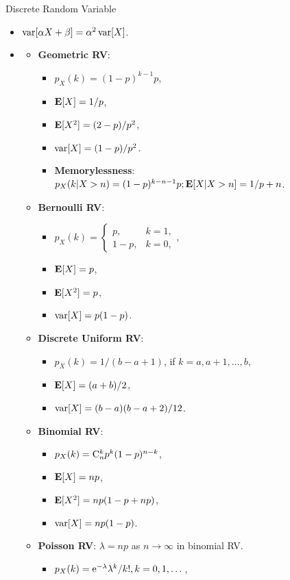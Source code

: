 \documentclass[landscape,a4paper]{article}
\begin{document}
\begin{cheatsheetcolumns}
\begin{card}{Discrete Random Variable}
\begin{itemize}
				\item $\operatorname{var}[\alpha X+\beta]=\alpha^2\operatorname{var}[X]$.
				\item \begin{itemize}
					\item \textbf{Geometric RV}:
					\begin{itemize}
						\item $p_X(k)=(1-p)^{k-1}p$,
						\item $\mathbf{E}[X]=1/p$,
						\item $\mathbf{E}[X^2]=(2-p)/p^2$,
						\item $\operatorname{var}[X]=(1-p)/p^2$.
						\item \textbf{Memorylessness}:\\ $p_X(k|X>n)=(1-p)^{k-n-1}p;\mathbf{E}[X|X > n]=1/p + n$.
					\end{itemize}
					\item \textbf{Bernoulli RV}:
					\begin{itemize}
						\item $p_X(k)=\begin{cases}p,&k=1,\\1-p,&k=0,\end{cases}$,
						\item $\mathbf{E}[X]=p$,
						\item $\mathbf{E}[X^2]=p$,
						\item $\operatorname{var}[X]=p(1-p)$.
					\end{itemize}
					\item \textbf{Discrete Uniform RV}:
					\begin{itemize}
						\item $p_X(k)=1/(b-a+1)$, if $k=a,a+1,\dots,b$,
						\item $\mathbf{E}[X]=(a+b)/2$,
						\item $\operatorname{var}[X]=(b-a)(b-a+2)/12$.
					\end{itemize}
					\item \textbf{Binomial RV}:
					\begin{itemize}
						\item $p_X(k)=\mathrm{C}_{n}^{k}p^k(1-p)^{n-k}$,
						\item $\mathbf{E}[X]=np$,
						\item $\mathbf{E}[X^2]=np(1-p+np)$,
						\item $\operatorname{var}[X]=np(1-p)$.
					\end{itemize}
					\item \textbf{Poisson RV}: $\lambda=np$ as $n\to\infty$ in binomial RV.
					\begin{itemize}
						\item $p_X(k)=\mathrm{e}^{-\lambda}\lambda^k/k!,k=0,1,\dots$,

\end{itemize}
\end{itemize}
\end{itemize}
\end{card}
\end{cheatsheetcolumns}
\end{document}
